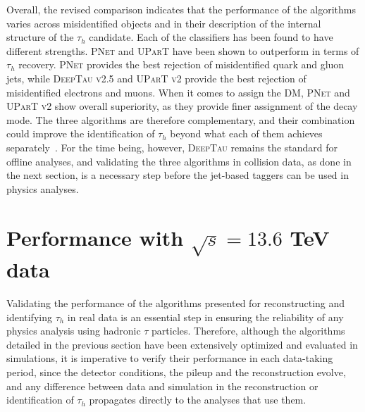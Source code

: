 \noindent Overall, the revised comparison indicates that the performance of the algorithms varies across misidentified objects and in their description of the internal structure of the $\tau_h$ candidate. Each of the classifiers has been found to have different strengths. \textsc{PNet} and \textsc{UParT} have been shown to outperform in terms of $\tau_h$ recovery. \textsc{PNet} provides the best rejection of misidentified quark and gluon jets, while \textsc{DeepTau v2.5} and \textsc{UParT v2} provide the best rejection of misidentified electrons and muons. When it comes to assign the DM, \textsc{PNet} and \textsc{UParT v2} show overall superiority, as they provide finer assignment of the decay mode. The three algorithms are therefore complementary, and their combination could improve the identification of $\tau_h$ beyond what each of them achieves separately~\cite{CMS-DP-2025-073}. For the time being, however, \textsc{DeepTau} remains the standard for offline analyses, and validating the three algorithms in collision data, as done in the next section, is a necessary step before the jet-based taggers can be used in physics analyses.


\section{Performance with \texorpdfstring{$\sqrt{s}=13.6$ TeV}{√s = 13.6 TeV} data}
\label{sec:Tau_validation}
Validating the performance of the algorithms presented for reconstructing and identifying $\tau_h$ in real data is an essential step in ensuring the reliability of any physics analysis using hadronic $\tau$ particles. Therefore, although the algorithms detailed in the previous section have been extensively optimized and evaluated in simulations, it is imperative to verify their performance in each data-taking period, since the detector conditions, the pileup and the reconstruction evolve, and any difference between data and simulation in the reconstruction or identification of $\tau_h$ propagates directly to the analyses that use them.


